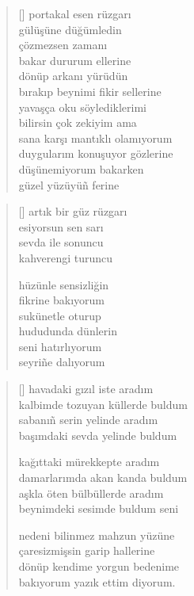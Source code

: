 \documentclass[10pt, openright, twoside]{memoir}
\theoremstyle{definition}
\begin{document}
\begin{verse}[\versewidth]
  portakal esen rüzgarı \\
  gülüşüne düğümledin \\
  çözmezsen zamanı \\
  bakar dururum ellerine \\
  dönüp arkanı yürüdün \\
  bırakıp beynimi fikir sellerine \\
  yavaşça oku söylediklerimi \\
  bilirsin çok zekiyim ama \\
  sana karşı mantıklı olamıyorum \\
  duygularım konuşuyor gözlerine \\
  düşünemiyorum bakarken \\
  güzel yüzüyü\~n ferine
\end{verse}
\vspace*{\fill}
%
\newpage
{}
\vspace*{\fill}
\settowidth{\versewidth}{artık bir güz rüzgarı}
\begin{verse}[\versewidth]
  artık bir güz rüzgarı \\
  esiyorsun sen sarı \\
  sevda ile sonuncu \\
  kahverengi turuncu

  hüzünle sensizliğin \\
  fikrine bakıyorum \\
  sukünetle oturup \\
  hududunda dünlerin \\
  seni hatırlıyorum \\
  seyri\~ne dalıyorum
\end{verse}
\vspace*{\fill}
%
\newpage
{}
\vspace*{\fill}
\settowidth{\versewidth}{kalbimde tozuyan küllerde buldum}
\begin{verse}[\versewidth]
  havadaki gızıl iste aradım \\
  kalbimde tozuyan küllerde buldum \\
  sabanı\~n serin yelinde aradım \\
  başımdaki sevda yelinde buldum

  kağıttaki mürekkepte aradım \\
  damarlarımda akan kanda buldum \\
  aşkla öten bülbüllerde aradım \\
  beynimdeki sesimde buldum seni

  nedeni bilinmez mahzun yüzüne \\
  çaresizmişsin garip hallerine \\
  dönüp kendime yorgun bedenime \\
  bakıyorum yazık ettim diyorum.
\end{verse}
\end{document}
